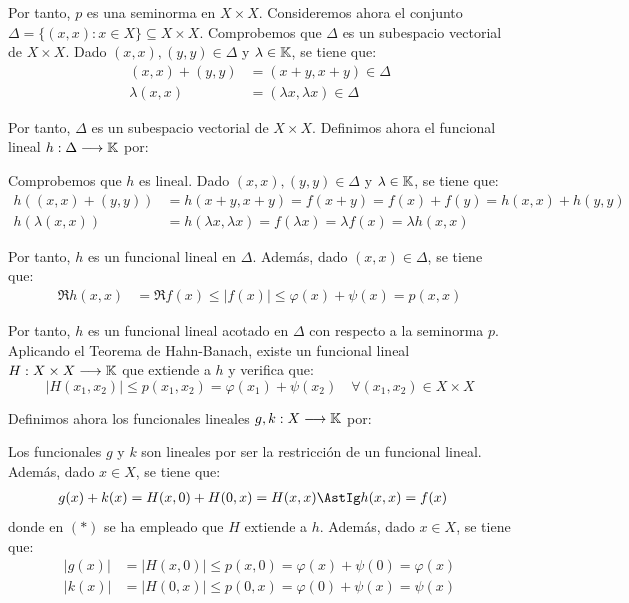 \begin{ejercicio}
    Por tanto, $p$ es una seminorma en $X \times X$. Consideremos ahora el conjunto $\Delta = \{(x, x) : x \in X\} \subseteq X \times X$. Comprobemos que $\Delta$ es un subespacio vectorial de $X \times X$. Dado $(x, x), (y, y) \in \Delta$ y $\lambda \in \mathbb{K}$, se tiene que:
    \begin{align*}
        (x, x) + (y, y) &= (x + y, x + y) \in \Delta \\
        \lambda(x, x) &= (\lambda x, \lambda x) \in \Delta
    \end{align*}

    Por tanto, $\Delta$ es un subespacio vectorial de $X \times X$. Definimos ahora el funcional lineal $h: \Delta \longrightarrow \mathbb{K}$ por:

    Comprobemos que $h$ es lineal. Dado $(x, x), (y, y) \in \Delta$ y $\lambda \in \mathbb{K}$, se tiene que:
    \begin{align*}
        h((x, x) + (y, y)) &= h(x + y, x + y) = f(x + y) = f(x) + f(y) = h(x, x) + h(y, y) \\
        h(\lambda(x, x)) &= h(\lambda x, \lambda x) = f(\lambda x) = \lambda f(x) = \lambda h(x, x)
    \end{align*}

    Por tanto, $h$ es un funcional lineal en $\Delta$. Además, dado $(x, x) \in \Delta$, se tiene que:
    \begin{align*}
        \Re h(x, x) &= \Re f(x) \leq |f(x)| \leq \varphi(x) + \psi(x) = p(x, x)
    \end{align*}

    Por tanto, $h$ es un funcional lineal acotado en $\Delta$ con respecto a la seminorma $p$. Aplicando el Teorema de Hahn-Banach, existe un funcional lineal $H: X \times X \longrightarrow \mathbb{K}$ que extiende a $h$ y verifica que:
    \[
        |H(x_1, x_2)| \leq p(x_1, x_2) = \varphi(x_1) + \psi(x_2) \quad \forall (x_1, x_2) \in X \times X
    \]


    Definimos ahora los funcionales lineales $g, k: X \longrightarrow \mathbb{K}$ por:

    Los funcionales $g$ y $k$ son lineales por ser la restricción de un funcional lineal. Además, dado $x \in X$, se tiene que:
    \begin{align*}
        g(x) + k(x) &= H(x, 0) + H(0, x) = H(x, x) \AstIg h(x, x) = f(x)
    \end{align*}
    donde en $(\ast)$ se ha empleado que $H$ extiende a $h$. Además, dado $x \in X$, se tiene que:
    \begin{align*}
        |g(x)| &= |H(x, 0)| \leq p(x, 0) = \varphi(x) + \psi(0) = \varphi(x) \\
        |k(x)| &= |H(0, x)| \leq p(0, x) = \varphi(0) + \psi(x) = \psi(x)
    \end{align*}
\end{ejercicio}

